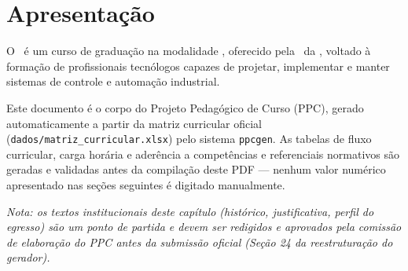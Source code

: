 \chapter{Apresentação}

O \ppccurso\ é um curso de graduação na modalidade \ppcmodalidade, oferecido
pela \ppcunidadeacademica\ da \ppcinstituicao, voltado à formação de
profissionais tecnólogos capazes de projetar, implementar e manter sistemas
de controle e automação industrial.

Este documento é o corpo do Projeto Pedagógico de Curso (PPC), gerado
automaticamente a partir da matriz curricular oficial
(\texttt{dados/matriz\_curricular.xlsx}) pelo sistema \texttt{ppcgen}. As
tabelas de fluxo curricular, carga horária e aderência a competências e
referenciais normativos são geradas e validadas antes da compilação deste
PDF — nenhum valor numérico apresentado nas seções seguintes é digitado
manualmente.

\textit{Nota: os textos institucionais deste capítulo (histórico,
justificativa, perfil do egresso) são um ponto de partida e devem ser
redigidos e aprovados pela comissão de elaboração do PPC antes da submissão
oficial (Seção 24 da reestruturação do gerador).}
